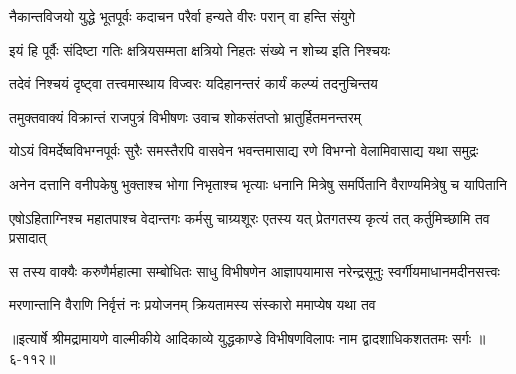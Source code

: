 \twolineshloka
{नैकान्तविजयो युद्धे भूतपूर्वः कदाचन}
{परैर्वा हन्यते वीरः परान् वा हन्ति संयुगे} %

\twolineshloka
{इयं हि पूर्वैः संदिष्टा गतिः क्षत्रियसम्मता}
{क्षत्रियो निहतः संख्ये न शोच्य इति निश्चयः} %

\twolineshloka
{तदेवं निश्चयं दृष्ट्वा तत्त्वमास्थाय विज्वरः}
{यदिहानन्तरं कार्यं कल्प्यं तदनुचिन्तय} %

\twolineshloka
{तमुक्तवाक्यं विक्रान्तं राजपुत्रं विभीषणः}
{उवाच शोकसंतप्तो भ्रातुर्हितमनन्तरम्} %

\twolineshloka
{योऽयं विमर्देष्वविभग्नपूर्वः सुरैः समस्तैरपि वासवेन}
{भवन्तमासाद्य रणे विभग्नो वेलामिवासाद्य यथा समुद्रः} %

\twolineshloka
{अनेन दत्तानि वनीपकेषु भुक्ताश्च भोगा निभृताश्च भृत्याः}
{धनानि मित्रेषु समर्पितानि वैराण्यमित्रेषु च यापितानि} %

\twolineshloka
{एषोऽहिताग्निश्च महातपाश्च वेदान्तगः कर्मसु चाग्र्यशूरः}
{एतस्य यत् प्रेतगतस्य कृत्यं तत् कर्तुमिच्छामि तव प्रसादात्} %

\twolineshloka
{स तस्य वाक्यैः करुणैर्महात्मा सम्बोधितः साधु विभीषणेन}
{आज्ञापयामास नरेन्द्रसूनुः स्वर्गीयमाधानमदीनसत्त्वः} %

\twolineshloka
{मरणान्तानि वैराणि निर्वृत्तं नः प्रयोजनम्}
{क्रियतामस्य संस्कारो ममाप्येष यथा तव} %


॥इत्यार्षे श्रीमद्रामायणे वाल्मीकीये आदिकाव्ये युद्धकाण्डे विभीषणविलापः नाम द्वादशाधिकशततमः सर्गः ॥६-११२॥
